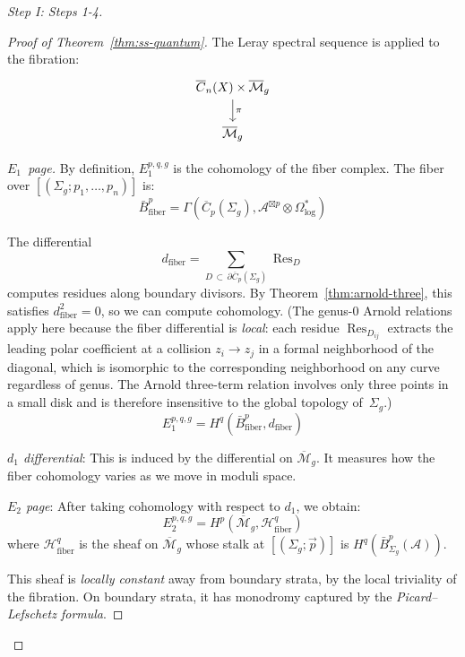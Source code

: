\begin{proof}[Step I: Steps 1-4]
\begin{proof}[Proof of Theorem~\ref{thm:ss-quantum}]
The Leray spectral sequence is applied to the fibration:
\begin{equation}
\begin{tikzcd}
\overline{C}_n(X) \times \overline{\mathcal{M}}_g \arrow[d, "\pi"] \\
\overline{\mathcal{M}}_g
\end{tikzcd}
\end{equation}

\emph{$E_1$~page.}
By definition, $E_1^{p,q,g}$ is the cohomology
of the fiber complex.
The fiber over
$[(\Sigma_g;\allowbreak p_1, \ldots, p_n)]$ is:
\begin{equation}
\bar{B}^p_{\text{fiber}} = \Gamma(\overline{C}_p(\Sigma_g), \mathcal{A}^{\boxtimes p} 
\otimes \Omega^*_{\log})
\end{equation}

The differential
\[
d_{\mathrm{fiber}} = \!\!\!\!\sum_{D \,\subset\, \partial \overline{C}_p(\Sigma_g)}
\!\!\!\!\operatorname{Res}_D
\]
computes residues along boundary divisors. By Theorem~\ref{thm:arnold-three},
this satisfies $d_{\text{fiber}}^2 = 0$, so we can compute cohomology.
(The genus-$0$ Arnold relations apply here because the fiber
differential is \emph{local}: each residue $\operatorname{Res}_{D_{ij}}$
extracts the leading polar coefficient at a collision $z_i \to z_j$
in a formal neighborhood of the diagonal, which is isomorphic to
the corresponding neighborhood on any curve regardless of genus.
The Arnold three-term relation involves only three points in a
small disk and is therefore insensitive to the global topology
of~$\Sigma_g$.)
\begin{equation}
E_1^{p,q,g} = H^q(\bar{B}^p_{\text{fiber}}, d_{\text{fiber}})
\end{equation}

\emph{$d_1$ differential}: This is induced by the differential on $\overline{
\mathcal{M}}_g$. It measures how the fiber cohomology varies as we move in moduli space.

\emph{$E_2$ page}: After taking cohomology with respect to $d_1$, we obtain:
\begin{equation}
E_2^{p,q,g} = H^p(\overline{\mathcal{M}}_g, \mathcal{H}^q_{\text{fiber}})
\end{equation}
where $\mathcal{H}^q_{\text{fiber}}$ is the sheaf on $\overline{\mathcal{M}}_g$ whose 
stalk at $[(\Sigma_g; \vec{p})]$ is $H^q(\bar{B}^p_{\Sigma_g}(\mathcal{A}))$.

This sheaf is \emph{locally constant} away from boundary strata, by the local 
triviality of the fibration. On boundary strata, it has monodromy captured by the 
\emph{Picard--Lefschetz formula}.
\end{proof}


\end{proof}
